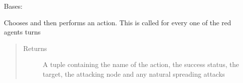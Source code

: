 \documentclass[letterpaper,10pt,english]{sphinxmanual}
\begin{document}
\begin{fulllineitems}
\label{\detokenize{source/yawning_titan.envs.generic.core:yawning_titan.envs.generic.core.red_interface.RedInterface}}
\sphinxAtStartPar
Bases: {\hyperref[\detokenize{source/yawning_titan.envs.generic.core:yawning_titan.envs.generic.core.red_action_set.RedActionSet}]{}}

\begin{fulllineitems}
\label{\detokenize{source/yawning_titan.envs.generic.core:yawning_titan.envs.generic.core.red_interface.RedInterface.perform_action}}
\sphinxAtStartPar
Chooses and then performs an action. This is called for every one of the red agents turns
\begin{quote}\begin{description}
\item[{Returns}] \leavevmode
\sphinxAtStartPar
A tuple containing the name of the action, the success status, the target, the attacking node and any natural spreading attacks

\end{description}\end{quote}

\end{fulllineitems}


\end{fulllineitems}
\end{document}
